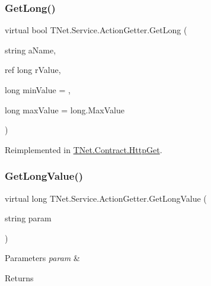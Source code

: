 \subsubsection{\texorpdfstring{Get\+Long()}{GetLong()}}
{\footnotesize\ttfamily virtual bool T\+Net.\+Service.\+Action\+Getter.\+Get\+Long (\begin{DoxyParamCaption}\item[{string}]{a\+Name,  }\item[{ref long}]{r\+Value,  }\item[{long}]{min\+Value = {},  }\item[{long}]{max\+Value = {\ttfamily long.MaxValue} }\end{DoxyParamCaption})\hspace{0.3cm}{\ttfamily [virtual]}}







Reimplemented in \mbox{\hyperlink{class_t_net_1_1_contract_1_1_http_get_ad32a67f657f1a0cb903ede041b76ae49}{T\+Net.\+Contract.\+Http\+Get}}.

\mbox{\label{class_t_net_1_1_service_1_1_action_getter_ada14b85166336d05bcb01e384edb2d7f}} 
\subsubsection{\texorpdfstring{Get\+Long\+Value()}{GetLongValue()}\hspace{0.1cm}{\footnotesize\ttfamily [1/2]}}
{\footnotesize\ttfamily virtual long T\+Net.\+Service.\+Action\+Getter.\+Get\+Long\+Value (\begin{DoxyParamCaption}\item[{string}]{param }\end{DoxyParamCaption})\hspace{0.3cm}{\ttfamily [virtual]}}






\begin{DoxyParams}{Parameters}
{\em param} & \\
\hline
\end{DoxyParams}
\begin{DoxyReturn}{Returns}

\end{DoxyReturn}



